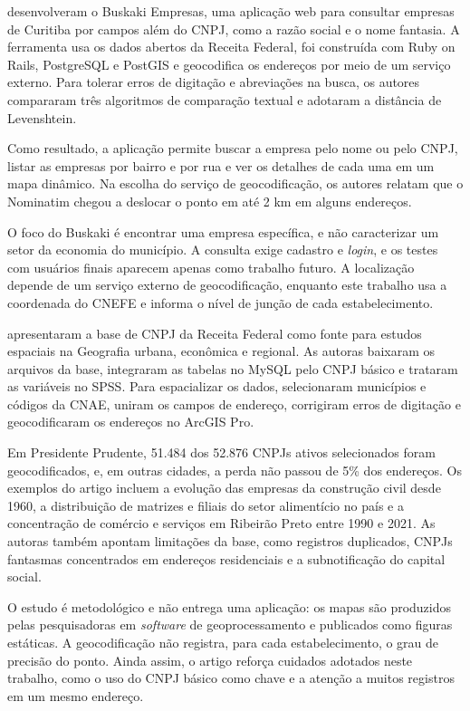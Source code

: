  desenvolveram o Buskaki Empresas, uma aplicação web para consultar empresas de Curitiba por campos além do CNPJ, como a razão social e o nome fantasia.
A ferramenta usa os dados abertos da Receita Federal, foi construída com Ruby on Rails, PostgreSQL e PostGIS e geocodifica os endereços por meio de um serviço externo.
Para tolerar erros de digitação e abreviações na busca, os autores compararam três algoritmos de comparação textual e adotaram a distância de Levenshtein.

Como resultado, a aplicação permite buscar a empresa pelo nome ou pelo CNPJ, listar as empresas por bairro e por rua e ver os detalhes de cada uma em um mapa dinâmico.
Na escolha do serviço de geocodificação, os autores relatam que o Nominatim chegou a deslocar o ponto em até 2 km em alguns endereços.

O foco do Buskaki é encontrar uma empresa específica, e não caracterizar um setor da economia do município.
A consulta exige cadastro e \textit{login}, e os testes com usuários finais aparecem apenas como trabalho futuro.
A localização depende de um serviço externo de geocodificação, enquanto este trabalho usa a coordenada do CNEFE e informa o nível de junção de cada estabelecimento.

 apresentaram a base de CNPJ da Receita Federal como fonte para estudos espaciais na Geografia urbana, econômica e regional.
As autoras baixaram os arquivos da base, integraram as tabelas no MySQL pelo CNPJ básico e trataram as variáveis no SPSS.
Para espacializar os dados, selecionaram municípios e códigos da CNAE, uniram os campos de endereço, corrigiram erros de digitação e geocodificaram os endereços no ArcGIS Pro.

Em Presidente Prudente, 51.484 dos 52.876 CNPJs ativos selecionados foram geocodificados, e, em outras cidades, a perda não passou de 5\% dos endereços.
Os exemplos do artigo incluem a evolução das empresas da construção civil desde 1960, a distribuição de matrizes e filiais do setor alimentício no país e a concentração de comércio e serviços em Ribeirão Preto entre 1990 e 2021.
As autoras também apontam limitações da base, como registros duplicados, CNPJs fantasmas concentrados em endereços residenciais e a subnotificação do capital social.

O estudo é metodológico e não entrega uma aplicação: os mapas são produzidos pelas pesquisadoras em \textit{software} de geoprocessamento e publicados como figuras estáticas.
A geocodificação não registra, para cada estabelecimento, o grau de precisão do ponto.
Ainda assim, o artigo reforça cuidados adotados neste trabalho, como o uso do CNPJ básico como chave e a atenção a muitos registros em um mesmo endereço.

